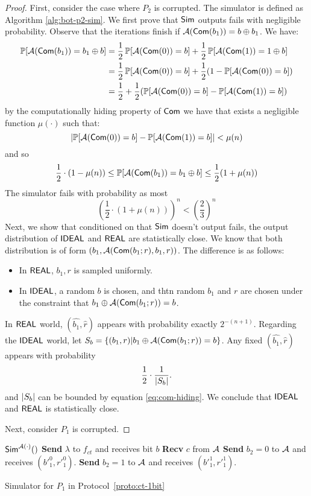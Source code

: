 \begin{proof}
First, consider the case where $P_2$ is corrupted. The simulator is defined as Algorithm \ref{alg:bot-p2-sim}. We first prove that ${\sf Sim}$ outputs {\sf fails} with negligible probability.
Observe that the iterations finish if $\mathcal{A}({\sf Com}(b_1))=b\oplus b_1$. We have:
    \begin{align*}
        \mathop{\mathbb P\/}[\mathcal{A}({\sf Com}(b_1))=b_1\oplus b]&=\frac{1}{2}\mathop{\mathbb P\/}[\mathcal{A}({\sf Com}(0))=b]+\frac{1}{2}\mathop{\mathbb P\/}[\mathcal{A}({\sf Com}(1))=1\oplus b]\\
        &=\frac{1}{2}\mathop{\mathbb P\/}[\mathcal{A}({\sf Com}(0))=b]+\frac{1}{2}(1-\mathop{\mathbb P\/}[\mathcal{A}({\sf Com}(0))=b]) \\
        &=\frac{1}{2}+\frac{1}{2}(\mathop{\mathbb P\/}[\mathcal{A}({\sf Com}(0))=b]-\mathop{\mathbb P\/}[\mathcal{A}({\sf Com}(1))=b])
    \end{align*}
by the computationally hiding property of ${\sf Com}$ we have that exists a negligible function $\mu(\cdot)$ such that:
$$
    \left|\mathop{\mathbb P\/}[\mathcal{A}({\sf Com}(0))=b]-\mathop{\mathbb P\/}[\mathcal{A}({\sf Com}(1))=b]\right|<\mu(n)
$$
and so
\begin{equation}
    \frac{1}{2}\cdot(1-\mu(n))\leq\mathop{\mathbb P\/}[\mathcal{A}({\sf Com}(b_1))=b_1\oplus b]\leq\frac{1}{2}(1+\mu(n))\label{eq:com-hiding}
\end{equation}
The simulator fails with probability as most
$$
    \left(\frac{1}{2}\cdot(1+\mu(n))\right)^n <\left(\frac{2}{3}\right)^n
$$
Next, we show that conditioned on that ${\sf Sim}$ doesn't output {\sf fails}, the output distribution of ${\sf IDEAL}$ and ${\sf REAL}$ are statistically close. We know that both distribution is of form $(b_1, \mathcal{A}({\sf Com}(b_1;r), b_1, r))$. The difference is as follows:
    \begin{itemize}
        \item In ${\sf REAL}$, $b_1, r$ is sampled uniformly.
        \item In ${\sf IDEAL}$, a random $b$ is chosen, and thtn random $b_1$ and $r$ are chosen under the constraint that $b_1\oplus\mathcal{A}({\sf Com}(b_1;r))=b$.
    \end{itemize}
In ${\sf REAL}$ world, $(\hat{b_1},\hat{r})$ appears with probability exactly $2^{-(n+1)}$. Regarding the ${\sf IDEAL}$ world, let $S_b=\{(b_1,r)|b_1\oplus\mathcal{A}({\sf Com}(b_1;r))=b\}$. Any fixed $(\hat{b_1},\hat{r})$ appears with probability
$$
    \frac{1}{2}\cdot\frac{1}{\left|S_b\right|}.
$$
and $\left|S_b\right|$ can be bounded by equation \ref{eq:com-hiding}. We conclude that ${\sf IDEAL}$ and ${\sf REAL}$ is statistically close.

Next, consider $P_1$ is corrupted.
\end{proof}

\begin{algorithm}
${\sf Sim}^{\mathcal{A}(\cdot)}()$\;
{\bf Send} $\lambda$ to $f_{ct}$ and receives bit $b$\;
{\bf Recv} $c$ from $\mathcal{A}$\;
{\bf Send} $b_2=0$ to $\mathcal{A}$ and receives $({b'}_1^0,{r'}_1^0)$.\;
{\bf Send} $b_2=1$ to $\mathcal{A}$ and receives $({b'}_1^1,{r'}_1^1)$.\;

\caption{Simulator for $P_1$ in Protocol~\ref{proto:ct-1bit}}\label{alg:ct-1bit-sim-p2}
\end{algorithm}